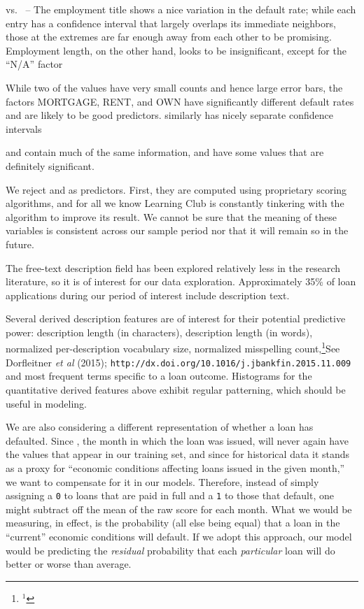  vs.\  -- The employment title shows a nice variation in the default rate; while each entry has a confidence interval that largely overlaps its immediate neighbors, those at the extremes are far enough away from each other to be promising. Employment length, on the other hand, looks to be insignificant, except for the “N/A” factor

 While two of the values have very small counts and hence large error bars, the factors MORTGAGE, RENT, and OWN have significantly different default rates and are likely to be good predictors.  similarly has nicely separate confidence intervals

 and  contain much of the same information, and have some values that are definitely significant.

We reject  and  as predictors. First, they are computed using proprietary scoring algorithms, and for all we know Learning Club is constantly tinkering with the algorithm to improve its result. We cannot be sure that the meaning of these variables is consistent across our sample period nor that it will remain so in the future.

The free-text description field has been explored relatively less in
the research literature, so it is of interest for our data
exploration. Approximately 35\% of loan applications during our period
of interest include description text.

Several derived description features are of interest for their potential
predictive power: description length (in characters), description
length (in words), normalized per-description vocabulary size,
normalized misspelling count,\footnote{$^1$}{See Dorfleitner {\it et al}
(2015); {\tt http://dx.doi.org/10.1016/j.jbankfin.2015.11.009}} and
most frequent terms specific to a loan outcome. Histograms for the
quantitative derived features above exhibit regular patterning, which
should be useful in modeling.

We are also considering a different representation of whether a loan
has defaulted. Since , the month in which the loan was
issued, will never again have the values that appear in our training
set, and since for historical data it stands as a proxy for ``economic
conditions affecting loans issued in the given month,'' we want to
compensate for it in our models. Therefore, instead of simply
assigning a {\tt 0} to loans that are paid in full and a {\tt 1} to
those that default, one might subtract off the mean of the raw score
for each month. What we would be measuring, in effect, is the
probability (all else being equal) that a loan in the ``current''
economic conditions will default. If we adopt this approach, our model
would be predicting the {\it residual} probability that each {\it
particular} loan will do better or worse than average.

